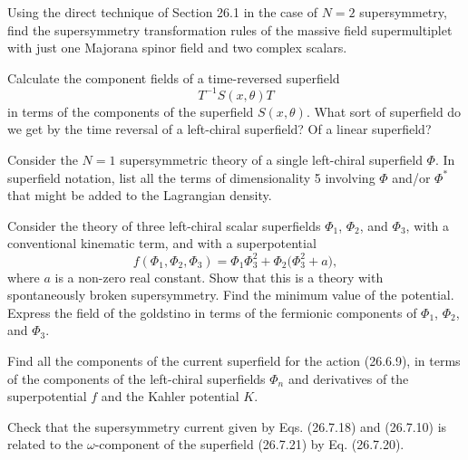 
\begin{enumerate}
   Using the direct technique of Section 26.1 in the case of $N=2$
  supersymmetry, find the supersymmetry transformation rules of the
  massive field supermultiplet with just one Majorana spinor field and
  two complex scalars.

   Calculate the component fields of a time-reversed superfield
  \[
    T^{-1}S(x,\theta)T
  \]
  in terms of the components of the superfield $S(x,\theta)$. What sort
  of superfield do we get by the time reversal of a left-chiral
  superfield? Of a linear superfield?

   Consider the $N=1$ supersymmetric theory of a single left-chiral
  superfield $\Phi$. In superfield notation, list all the terms of
  dimensionality 5 involving $\Phi$ and/or $\Phi^*$ that might be added
  to the Lagrangian density.

   Consider the theory of three left-chiral scalar superfields
  $\Phi_1$, $\Phi_2$, and $\Phi_3$, with a conventional kinematic term,
  and with a superpotential
  \[
    f(\Phi_1,\Phi_2,\Phi_3)
    = \Phi_1\Phi_3^2+\Phi_2\bigl(\Phi_3^2+a\bigr),
  \]
  where $a$ is a non-zero real constant. Show that this is a theory with
  spontaneously broken supersymmetry. Find the minimum value of the
  potential. Express the field of the goldstino in terms of the
  fermionic components of $\Phi_1$, $\Phi_2$, and $\Phi_3$.

   Find all the components of the current superfield for the action
  (26.6.9), in terms of the components of the left-chiral superfields
  $\Phi_n$ and derivatives of the superpotential $f$ and the Kahler
  potential $K$.

   Check that the supersymmetry current given by Eqs. (26.7.18) and
  (26.7.10) is related to the $\omega$-component of the superfield
  (26.7.21) by Eq. (26.7.20).
\end{enumerate}
